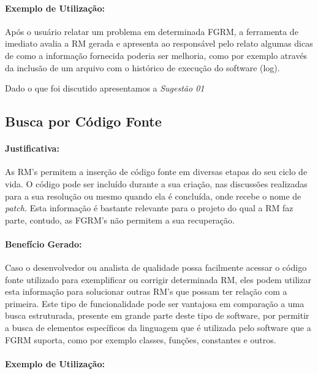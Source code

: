\paragraph{Exemplo de Utilização:}
\label{par:exemplo_s01}

Após o usuário relatar um problema em determinada FGRM, a ferramenta de imediato
avalia a RM gerada e apresenta ao responsável pelo relato algumas dicas de como
a informação fornecida poderia ser melhoria, como por exemplo através da
inclusão de um arquivo com o histórico de execução do software (log).

Dado o que foi discutido apresentamos a \textit{Sugestão 01}

\subsection{Busca por Código Fonte}
\label{sub:busca_por_código_fonte}

\paragraph{Justificativa:}
\label{par:justificativa_s02}

As RM's permitem a inserção de código fonte em diversas etapas do seu ciclo de
vida. O código pode ser incluído durante a sua criação, nas discussões
realizadas para a sua resolução ou mesmo quando ela é concluída, onde recebe o
nome de \textit{patch.} Esta informação é bastante relevante para o projeto do
qual a RM faz parte, contudo, as FGRM's não permitem a sua recuperação.

\paragraph{Benefício Gerado:}
\label{par:beneficios_s02}

Caso o desenvolvedor ou analista de qualidade possa facilmente acessar o código
fonte utilizado para exemplificar ou corrigir determinada RM, eles podem
utilizar esta informação para solucionar outras RM's que possam ter relação com
a primeira. Este tipo de funcionalidade pode ser vantajosa em comparação a uma
busca estruturada, presente em grande parte deste tipo de software, por permitir
a busca de elementos específicos da linguagem que é utilizada pelo software que
a FGRM suporta, como por exemplo classes, funções, constantes e outros.

\paragraph{Exemplo de Utilização:}
\label{par:exemplo_s02}

